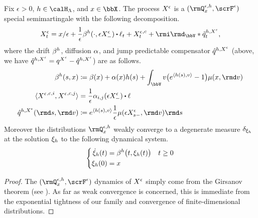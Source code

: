 \begin{proposition}
  \label{proposition:mgPrb-dynamics}
  Fix $\epsilon > 0$, $\twistFunc \in \twistSpace$, and $\stateVar \in \stateSpace$.
  The process $X^\epsilon$ is a $(\mgPrb^{\epsilon,\twistFunc}_\stateVar, \scrF^\epsilon)$ special semimartingale with the following decomposition.
  \begin{equation*}
    \Xee_t = \stateVar/\epsilon + \frac1\epsilon \affDrift^\twistFunc(\cdot, \Xe_-) \shortInt \leb_t + {\Xee_t}^{,c} + \id_\vecSpace \ast \compensate{\jumpMeas^{\twistFunc,\Xee}}_t,
  \end{equation*}
  where the drift $\beta^h$, diffusion $\alpha$, and jump predictable compensator $\hat{q}^{h,X^\epsilon}$ (above, we have $\tilde{q}^{h,X^\epsilon} = q^{X^\epsilon} - \hat{q}^{h,X^\epsilon}$) are as follows.
  \begin{align*}
    \affDrift^\twistFunc(s, \stateVar) 
    &\defeq \affDrift(\stateVar) + \affDiff(\stateVar)\twistFunc(s) + \int_\vecSpace \markVar\big(e^\prj{\twistFunc(s)}{\markVar} - 1 \big) \affJump(\stateVar, \rmd\markVar) \\
    \langle {\Xee}^{,c,i}, {\Xee}^{,c,j} \rangle &= \frac1\epsilon\affDiff_{i,j}(\Xe_-) \shortInt \leb \\
    \predproj{\jumpMeas^{\twistFunc,\Xee}}(\rmd s, \rmd\markVar)  
    &\defeq e^\prj{\twistFunc(s)}{\markVar} \frac1\epsilon \affJump(\Xe_{s-}, \rmd\markVar) \rmd s
  \end{align*}
  Moreover the distributions $\mgPrb^{\epsilon,\twistFunc}_\stateVar$ weakly converge to a degenerate measure $\delta_{\xi_h}$ at the solution $\xi_h$ to the following dynamical system.
  \begin{equation}
    \label{eq:limit-ode}
    \left\{\begin{aligned}
      \dot{\xi}_h(t) &= \beta^h\big(t, \xi_h(t)\big) & t \geq 0 \\
      \xi_h(0) &= x
    \end{aligned}\right.
  \end{equation}
\end{proposition}
\begin{proof}
  The $(\mgPrb^{\epsilon,\twistFunc}_\stateVar, \scrF^\epsilon)$ dynamics of $X^\epsilon$ simply come from the Girsanov theorem (see \cite[Theorem III.3.24 or Theorem III.7.23]{jacod2003}).
  As far as weak convergence is concerned, this is immediate from the exponential tightness of our family and convergence of finite-dimensional distributions.
\end{proof}
